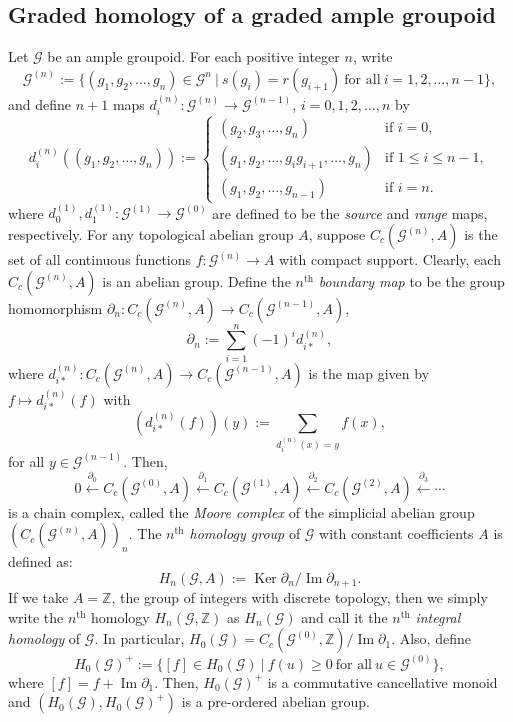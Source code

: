 \documentclass[12pt]{amsart}
\theoremstyle{definition}
\theoremstyle{remark}
\newcommand{\image}{\operatorname{Im}}
\newcommand{\Ker}{\operatorname{Ker}}
\begin{document}
\subsection{Graded homology of a graded ample groupoid}\label{ssec groupoid homology}
Let $\mathcal{G}$ be an ample groupoid. For each positive integer $n$, write \[\mathcal{G}^{(n)}:=\{(g_1,g_2,\ldots,g_n)\in \mathcal{G}^n~|~s(g_i)=r(g_{i+1})~\text{for all}~i=1,2,\ldots,n-1\},\] and define $n+1$ maps $d_i^{(n)}:\mathcal{G}^{(n)}\longrightarrow \mathcal{G}^{(n-1)}$, $i=0,1,2,\ldots,n$ by 
$$d_i^{(n)}((g_1,g_2,\ldots,g_n)):=
	\left\{
	\begin{array}{lll}
		(g_2,g_3,\ldots,g_n)  & \mbox{if } i=0, \\
		(g_1,g_2,\ldots,g_ig_{i+1},\ldots,g_n)  & \mbox{if } 1\le i\le n-1,\\
            (g_1,g_2,\ldots,g_{n-1})  & \mbox{if } i=n.
	\end{array}
	\right.$$ 
where $d_0^{(1)},d_1^{(1)}:\mathcal{G}^{(1)}\longrightarrow \mathcal{G}^{(0)}$ are defined to be the \emph{source} and \emph{range} maps, respectively. For any topological abelian group $A$, suppose $C_c(\mathcal{G}^{(n)},A)$ is the set of all continuous functions $f:\mathcal{G}^{(n)}\longrightarrow A$ with compact support. Clearly, each $C_c(\mathcal{G}^{(n)},A)$ is an abelian group. Define the $n^{\text{th}}$ \emph{boundary map} to be the group homomorphism $\partial_n:C_c(\mathcal{G}^{(n)},A)\longrightarrow C_c(\mathcal{G}^{(n-1)},A)$, \[\partial_n:=\displaystyle{\sum_{i=1}^{n}} (-1)^{i}d_{i*}^{(n)},\] where $d_{i*}^{(n)}:C_c(\mathcal{G}^{(n)},A)\longrightarrow C_c(\mathcal{G}^{(n-1)},A)$ is the map given by $f\longmapsto d_{i*}^{(n)}(f)$ with \[(d_{i*}^{(n)}(f))(y):=\displaystyle{\sum_{d_i^{(n)}(x)=y}} f(x),\] for all $y\in \mathcal{G}^{(n-1)}$. Then, \[0\overset{\partial_0}{\longleftarrow} C_c(\mathcal{G}^{(0)},A)\overset{\partial_1}{\longleftarrow} C_c(\mathcal{G}^{(1)},A)\overset{\partial_2}{\longleftarrow} C_c(\mathcal{G}^{(2)},A)\overset{\partial_3}{\longleftarrow}\cdots\] is a chain complex, called the \emph{Moore complex} of the simplicial abelian group $(C_c(\mathcal{G}^{(n)},A))_n$. The \emph{$n^{\text{th}}$ homology group} of $\mathcal{G}$ with constant coefficients $A$ is defined as: \[H_n(\mathcal{G},A):=\Ker \partial_n /\image \partial_{n+1}.\] If we take $A=\mathbb{Z}$, the group of integers with discrete topology, then we simply write the $n^{\text{th}}$ homology $H_n(\mathcal{G},\mathbb{Z})$ as $H_n(\mathcal{G})$ and call it the $n^{\text{th}}$ \emph{integral homology} of $\mathcal{G}$. In particular, $H_0(\mathcal{G})=C_c(\mathcal{G}^{(0)},\mathbb{Z})/\image \partial_1$. Also, define \[H_0(\mathcal{G})^+:=\{[f]\in H_0(\mathcal{G})~|~f(u)\ge 0~\text{for all}~u\in \mathcal{G}^{(0)}\},\] where $[f]=f+\image \partial_1$. Then, $H_0(\mathcal{G})^+$ is a commutative cancellative monoid and $(H_0(\mathcal{G}),H_0(\mathcal{G})^+)$ is a pre-ordered abelian group. 
\end{document}

